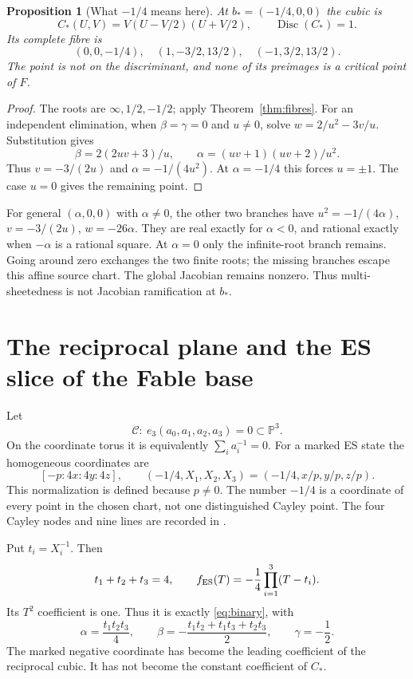 \documentclass[11pt]{article}
\newtheorem{proposition}[theorem]{Proposition}
\theoremstyle{remark}\newtheorem{remark}[theorem]{Remark}
\newcommand{\PP}{\mathbb P}\newcommand{\Res}{\operatorname{Res}}
\newcommand{\Disc}{\operatorname{Disc}}\newcommand{\tr}{\operatorname{tr}}
\begin{document}
\begin{proposition}[What $-1/4$ means here]\label{prop:quarter}
At $b_*=(-1/4,0,0)$ the cubic is
\[
 C_*(U,V)=V(U-V/2)(U+V/2),\qquad \Disc(C_*)=1.
\]
Its complete fibre is
\[
 (0,0,-1/4),\quad (1,-3/2,13/2),\quad(-1,3/2,13/2).
\]
The point is not on the discriminant, and none of its preimages is a critical point of $F$.
\end{proposition}
\begin{proof}
The roots are $\infty,1/2,-1/2$; apply Theorem~\ref{thm:fibres}. For an independent elimination, when $\beta=\gamma=0$ and $u\ne0$, solve
$w=2/u^2-3v/u$. Substitution gives
\[
 \beta=2(2uv+3)/u,\qquad
 \alpha=(uv+1)(uv+2)/u^2.
\]
Thus $v=-3/(2u)$ and $\alpha=-1/(4u^2)$. At $\alpha=-1/4$ this forces $u=\pm1$. The case $u=0$ gives the remaining point.
\end{proof}
For general $(\alpha,0,0)$ with $\alpha\ne0$, the other two branches have $u^2=-1/(4\alpha)$, $v=-3/(2u)$, $w=-26\alpha$. They are real exactly for $\alpha<0$, and rational exactly when $-\alpha$ is a rational square. At $\alpha=0$ only the infinite-root branch remains. Going around zero exchanges the two finite roots; the missing branches escape this affine source chart. The global Jacobian remains nonzero. Thus multi-sheetedness is not Jacobian ramification at $b_*$.

\section{The reciprocal plane and the ES slice of the Fable base}
Let
\[
 \mathscr C:\ e_3(a_0,a_1,a_2,a_3)=0\subset\PP^3.
\]
On the coordinate torus it is equivalently $\sum_i a_i^{-1}=0$. For a marked ES state the homogeneous coordinates are
\[
 [-p:4x:4y:4z],\qquad
 (-1/4,X_1,X_2,X_3)=(-1/4,x/p,y/p,z/p).
\]
This normalization is defined because $p\ne0$. The number $-1/4$ is a coordinate of every point in the chosen chart, not one distinguished Cayley point. The four Cayley nodes and nine lines are recorded in \citet[\S1, p.~1]{heathbrown}.

Put $t_i=X_i^{-1}$. Then
\begin{equation}\label{eq:sum4}
 t_1+t_2+t_3=4,
\qquad
 f_{\rm ES}(T)=-\frac14\prod_{i=1}^3(T-t_i).
\end{equation}
Its $T^2$ coefficient is one. Thus it is exactly \eqref{eq:binary}, with
\begin{equation}\label{eq:esbase}
 \alpha=\frac{t_1t_2t_3}{4},\qquad
 \beta=-\frac{t_1t_2+t_1t_3+t_2t_3}{2},\qquad
 \gamma=-\frac12.
\end{equation}
The marked negative coordinate has become the leading coefficient of the reciprocal cubic. It has not become the constant coefficient of $C_*$.
\end{document}
